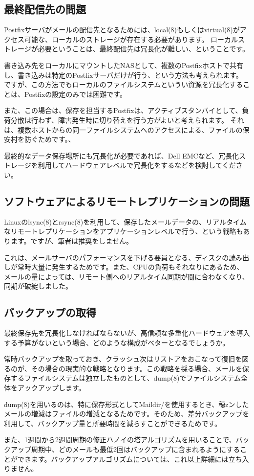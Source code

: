 \subsection{最終配信先の問題}

Postfixサーバがメールの配信先となるためには、local(8)もしくはvirtual(8)がアクセス可能な、ローカルのストレージが存在する必要があります。
ローカルストレージが必要ということは、最終配信先は冗長化が難しい、ということです。

書き込み先をローカルにマウントしたNASとして、複数のPostfixホストで共有し、書き込みは特定のPostfixサーバだけが行う、という方法も考えられます。
ですが、この方法でもローカルのファイルシステムというい資源を冗長化することは、Postfixの設定のみでは困難です。

また、この場合は、保存を担当するPostfixは、アクティブスタンバイとして、負荷分散は行わず、障害発生時に切り替えを行う方がよいと考えられます。
それは、複数ホストからの同一ファイルシステムへのアクセスによる、ファイルの保安村を防ぐためです。、

最終的なデータ保存場所にも冗長化が必要であれば、Dell EMCなど、冗長化ストレージを利用してハードウェアレベルで冗長化をするなどを検討してください。

\subsection{ソフトウェアによるリモートレプリケーションの問題}

Linuxのlsync(8)とrsync(8)を利用して、保存したメールデータの、リアルタイムなリモートレプリケーションをアプリケーションレベルで行う、という戦略もあります。ですが、筆者は推奨をしません。

これは、メールサーバのパフォーマンスを下げる要員となる、ディスクの読み出しが常時大量に発生するためです。また、CPUの負荷もそれなりにあるため、メールの量によっては、リモート側へのリアルタイム同期が間に合わなくなり、同期が破綻しました。

\subsection{バックアップの取得}

最終保存先を冗長化しなければならないが、高信頼な多重化ハードウェアを導入する予算がないという場合、どのような構成がベターとなるでしょうか。

常時バックアップを取っておき、クラッシュ次はリストアをおこなって復旧を図るのが、その場合の現実的な戦略となります。この戦略を採る場合、メールを保存するファイルシステムは独立したものとして、dump(8)でファイルシステム全体をアックアップします。

dump(8)を用いるのは、特に保存形式としてMaildir/を使用するとき、穂zンしたメールの増減はファイルの増減となるためです。そのため、差分バックアップを利用して、バックアップ量と所要時間を減らすことができるためです。

また、1週間から2週間周期の修正ハノイの塔アルゴリズムを用いることで、バックアップ周期中、どのメールも最低2回はバックアップに含まれるようにすることができます。バックアップアルゴリズムについては、これ以上詳細には立ち入りません。